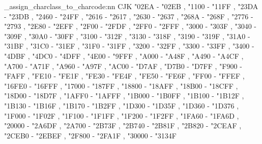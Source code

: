 \@@_assign_charclass_to_charcode:nn { CJK }
  {
    "02EA - "02EB ,
    "1100 - "11FF ,
    "23DA - "23DB ,
    "2460 - "24FF ,
    "2616 - "2617 ,
    "2630 - "2637 ,
    "268A - "268F ,
    "2776 - "2793 ,
    "2E80 - "2EFF ,
    "2F00 - "2FDF ,
    "2FF0 - "2FFF ,
    "3000 - "303F ,
    "3040 - "309F ,
    "30A0 - "30FF ,
    "3100 - "312F ,
    "3130 - "318F ,
    "3190 - "319F ,
    "31A0 - "31BF ,
    "31C0 - "31EF ,
    "31F0 - "31FF ,
    "3200 - "32FF ,
    "3300 - "33FF ,
    "3400 - "4DBF ,
    "4DC0 - "4DFF ,
    "4E00 - "9FFF ,
    "A000 - "A48F ,
    "A490 - "A4CF ,
    "A700 - "A71F ,
    "A960 - "A97F ,
    "AC00 - "D7AF ,
    "D7B0 - "D7FF ,
    "F900 - "FAFF ,
    "FE10 - "FE1F ,
    "FE30 - "FE4F ,
    "FE50 - "FE6F ,
    "FF00 - "FFEF ,
    "16FE0 - "16FFF ,
    "17000 - "187FF ,
    "18800 - "18AFF ,
    "18B00 - "18CFF ,
    "18D00 - "18D7F ,
    "1AFF0 - "1AFFF ,
    "1B000 - "1B0FF ,
    "1B100 - "1B12F ,
    "1B130 - "1B16F ,
    "1B170 - "1B2FF ,
    "1D300 - "1D35F ,
    "1D360 - "1D376 ,
    "1F000 - "1F02F ,
    "1F100 - "1F1FF ,
    "1F200 - "1F2FF ,
    "1FA60 - "1FA6D ,
    "20000 - "2A6DF ,
    "2A700 - "2B73F ,
    "2B740 - "2B81F ,
    "2B820 - "2CEAF ,
    "2CEB0 - "2EBEF ,
    "2F800 - "2FA1F ,
    "30000 - "3134F
  }

